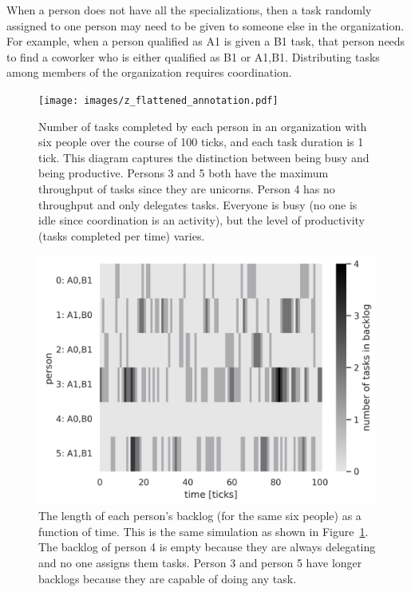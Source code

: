 When a person does not have all the specializations, then a task randomly assigned to one person may need to be given to someone else in the organization. For example, when a person qualified as A1 is given a B1 task, that person needs to find a coworker who is either qualified as B1 or A1,B1. Distributing tasks among members of the organization requires coordination.




\begin{figure}[H] %
\centering
\texttt{[image: images/z\_flattened\_annotation.pdf]}
\caption{Number of tasks completed by each person in an organization with six people over the course of 100 ticks, and each task duration is 1 tick. This diagram captures the distinction between being busy and being productive. Persons 3 and 5 both have the maximum throughput of tasks since they are unicorns. Person 4 has no throughput and only delegates tasks. Everyone is busy (no one is idle since coordination is an activity), but the level of productivity (tasks completed per time) varies.}
\label{fig:task-distribution-tasks-per-person}
\end{figure}



\begin{figure}[H] %
\centering
\includegraphics[width=1\textwidth]{images/task_distribution_backlog_length_per_person_simCount1_skills2_levels1_taskduration1_people6_social0_ticks100.png}
\caption{The length of each person's backlog (for the same six people) as a function of time. This is the same simulation as shown in Figure~\ref{fig:task-distribution-tasks-per-person}. The backlog of person 4 is empty because they are always delegating and no one assigns them tasks. Person 3 and person 5 have longer backlogs because they are capable of doing any task.}
\label{fig:task-distribution-backlog-length}
\end{figure}






